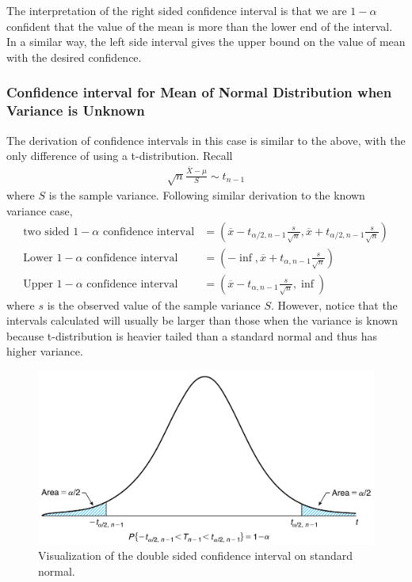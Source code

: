 \documentclass[../probability-notes.tex]{subfiles}
\begin{document}
    The interpretation of the right sided confidence interval is that we are $1-\alpha$ confident that the value of the mean is more than the lower end of the interval. In a similar way, the left side interval gives the upper bound on the value of mean with the desired confidence.


    \subsubsection{Confidence interval for Mean of Normal Distribution when Variance is Unknown}
    The derivation of confidence intervals in this case is similar to the above, with the only difference of using a t-distribution. Recall
    \begin{align*}
        \sqrt{n} \frac{\overline{X} - \mu}{S} \sim t_{n-1}
    \end{align*}
    where $S$ is the sample variance. Following similar derivation to the known variance case,
    \begin{align*}
        \text{two sided $1 - \alpha$ confidence interval} &= (\overline{x}-t_{\alpha /2, n-1}\frac{s}{\sqrt{n}}, \overline{x}+t_{\alpha /2, n-1}\frac{s}{\sqrt{n}})\\
        \text{Lower $1-\alpha$ confidence interval} &= (-\inf, \overline{x} + t_{\alpha, n-1}\frac{s}{\sqrt{n}})\\
        \text{Upper $1-\alpha$ confidence interval} &= (\overline{x} - t_{\alpha, n-1}\frac{s}{\sqrt{n}}, \inf)
    \end{align*}
    where $s$ is the observed value of the sample variance $S$. However, notice that the intervals calculated will usually be larger than those when the variance is known because t-distribution is heavier tailed than a standard normal and thus has higher variance.

    \begin{figure}[h]
    \includegraphics[scale=0.3]{../images/conf_2}
    \centering
    \caption{Visualization of the double sided confidence interval on standard normal.}
    \label{fig:conf_2} %
    \end{figure}
\end{document}
